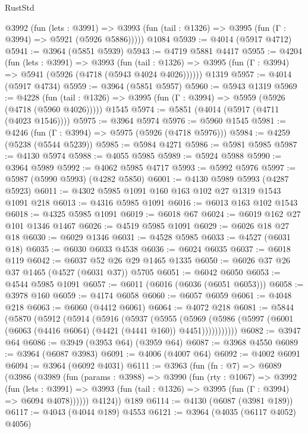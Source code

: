 \begin{lexlean}{RustStd}
\begin{coremodule}
{\begin{coremodule}
{{{{{{{{{{{{{{{{{{{{{{{{{{{{{{{{{{{{{{    @3992
      (fun (lets : @3991) =>
      @3993 (fun (tail : @1326) => @3995 (fun (Γ : @3994) => @5921 (@5926 @5886)))))
    @1084
@5939 := @4014 (@5917 @4712)
@5941 := @3964 (@5851 @5939)
@5943 := @4719 @5881 @4417
@5955 := @4204
    (fun (lets : @3991) =>
    @3993
      (fun (tail : @1326) => @3995 (fun (Γ : @3994) => @5941 (@5926 (@4718 (@5943 @4024 @4026))))))
    @1319
@5957 := @4014 (@5917 @4734)
@5959 := @3964 (@5851 @5957)
@5960 := @5943 @1319
@5969 := @4228
    (fun (tail : @1326) => @3995 (fun (Γ : @3994) => @5959 (@5926 (@4718 (@5960 @4026)))))
    @1545
@5974 := @5851 (@4014 (@5917 (@4711 (@4023 @1546))))
@5975 := @3964 @5974
@5976 := @5960 @1545
@5981 := @4246 (fun (Γ : @3994) => @5975 (@5926 (@4718 @5976)))
@5984 := @4259 (@5238 (@5544 @5239))
@5985 := @5984 @4271
@5986 := @5981 @5985
@5987 := @4130 @5974
@5988 := @4055 @5985
@5989 := @5924 @5988
@5990 := @3964 @5989
@5992 := @4062 @5985 @4717
@5993 := @5992 @5976
@5997 := @5987 (@5990 @5993) (@4282 @5850)
@6001 := @4130 @5989 @5993 (@4287 @5923)
@6011 := @4302 @5985 @1091 @160 @163 @102 @27 @1319 @1543 @1091 @218
@6013 := @4316 @5985 @1091
@6016 := @6013 @163 @102 @1543
@6018 := @4325 @5985 @1091
@6019 := @6018 @67
@6024 := @6019 @162 @27 @101 @1346 @1467
@6026 := @4519 @5985 @1091
@6029 := @6026 @18 @27 @18
@6030 := @6029 @1346
@6031 := @4528 @5985
@6033 := @4527 (@6031 @18)
@6035 := @6030 @6033 @4538
@6036 := @6024 @6035
@6037 := @6018 @119
@6042 := @6037 @52 @26 @29 @1465 @1335
@6050 := @6026 @37 @26 @37 @1465 (@4527 (@6031 @37)) @5705
@6051 := @6042 @6050
@6053 := @4544 @5985 @1091
@6057 := @6011 (@6016 (@6036 (@6051 @6053)))
@6058 := @3978 @160
@6059 := @4174 @6058
@6060 := @6057 @6059
@6061 := @4048 @218
@6063 := @6060 (@4412 @6061)
@6064 := @4072 @218
@6081 := @5844
    (@5870
      (@5912
        (@5914
          (@5916
            (@5937
              (@5955
                (@5969
                  (@5986 (@5997 (@6001 (@6063 (@4416 @6064) (@4421 (@4441 @160)) @4451)))))))))))
@6082 := @3947 @64
@6086 := @3949 (@3953 @64) (@3959 @64)
@6087 := @3968 @4550
@6089 := @3964 (@6087 @3983)
@6091 := @4006 (@4007 @64)
@6092 := @4002 @6091
@6094 := @3964 (@6092 @4031)
@6111 := @3963
    (fun (fn : @7) =>
    @6089
      (@3986
        (@3989
          (fun (params : @3988) =>
          @3990
            (fun (rty : @1067) =>
            @3992
              (fun (lets : @3991) =>
              @3993 (fun (tail : @1326) => @3995 (fun (Γ : @3994) => @6094 @4078))))))
        @4124))
    @189
@6114 := @4130 (@6087 (@3981 @189))
@6117 := @4043 (@4044 @189) @4553
@6121 := @3964 (@4035 (@6117 @4052) @4056)
}}}}}}}}}}}}}}}}}}}}}}}}}}}}}}}}}}}}}}
\end{coremodule}}
\end{coremodule}
\end{lexlean}
